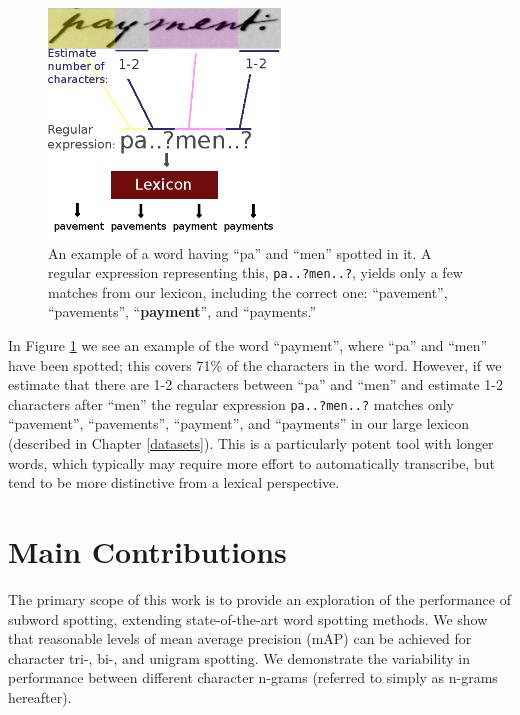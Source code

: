 \documentclass[ms,electronic,twosidetoc,letterpaper,chaptercenter,parttop,lof,lot]{byumsphd}
\begin{document}
\begin{figure}
    \centering
    \includegraphics[width=0.55\textwidth]{spotting_completion_payment}
    \caption{An example of a word having ``pa'' and ``men'' spotted in it. A regular expression representing this, \texttt{pa..?men..?}, yields only a few matches from our lexicon, including the correct one: ``pavement'', ``pavements'', ``\textbf{payment}'', and ``payments.''}
    \label{fig:subtransexample}
\end{figure}

In Figure \ref{fig:subtransexample} we see an example of the word ``payment'', where ``pa'' and ``men'' have been spotted; this covers 71\% of the characters in the word. However, if we estimate that there are 1-2 characters between ``pa'' and ``men'' and estimate 1-2 characters after ``men'' the regular expression \texttt{pa..?men..?} matches only ``pavement'', ``pavements'', ``payment'', and ``payments'' in our large lexicon (described in Chapter \ref{datasets}). This is a particularly potent tool with longer words, which typically may require more effort to automatically transcribe, but tend to be more distinctive from a lexical perspective.




\section{Main Contributions}

The primary scope of this work is to provide an exploration of the performance of subword spotting, extending state-of-the-art word spotting methods.
We show that reasonable levels of mean average precision (mAP) can be achieved for character tri-, bi-, and unigram spotting. We demonstrate the variability in performance between different character n-grams (referred to simply as n-grams hereafter).
\end{document}
